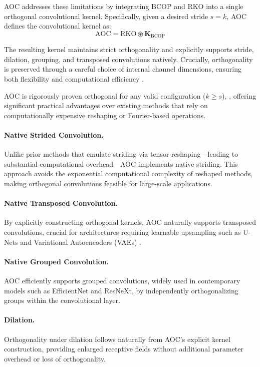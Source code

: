 \documentclass[10pt]{article}
\theoremstyle{plain}
\theoremstyle{definition}
\theoremstyle{remark}
\newcommand{\mathbconv}{\circledast} %
\newcommand{\kernel}[1]{\mathbf{#1}}
\begin{document}
    AOC addresses these limitations by integrating BCOP and RKO into a single orthogonal convolutional kernel. Specifically, given a desired stride $s=k$, AOC defines the convolutional kernel as:
    \begin{equation}
    {\text{AOC}}= {\text{RKO}} \mathbconv \kernel{K}_{\text{BCOP}}
    \end{equation}
    
    The resulting kernel maintains strict orthogonality and explicitly supports stride, dilation, grouping, and transposed convolutions natively. Crucially, orthogonality is preserved through a careful choice of internal channel dimensions, ensuring both flexibility and computational efficiency \cite{boissin2025adaptive}.
    
    AOC is rigorously proven orthogonal for any valid configuration ($k \ge s$), \cite{achour2022existence}, offering significant practical advantages over existing methods that rely on computationally expensive reshaping or Fourier-based operations.
        
    \paragraph{Native Strided Convolution.} Unlike prior methods that emulate striding via tensor reshaping—leading to substantial computational overhead—AOC implements native striding. This approach avoids the exponential computational complexity of reshaped methods, making orthogonal convolutions feasible for large-scale applications.
    
    \paragraph{Native Transposed Convolution.} By explicitly constructing orthogonal kernels, AOC naturally supports transposed convolutions, crucial for architectures requiring learnable upsampling such as U-Nets \cite{ronneberger2015u} and Variational Autoencoders (VAEs) \cite{kingma2013auto}.
    
    \paragraph{Native Grouped Convolution.} AOC efficiently supports grouped convolutions, widely used in contemporary models such as EfficientNet and ResNeXt, by independently orthogonalizing groups within the convolutional layer.
    
    \paragraph{Dilation.} Orthogonality under dilation follows naturally from AOC’s explicit kernel construction, providing enlarged receptive fields without additional parameter overhead or loss of orthogonality.
    
\end{document}
